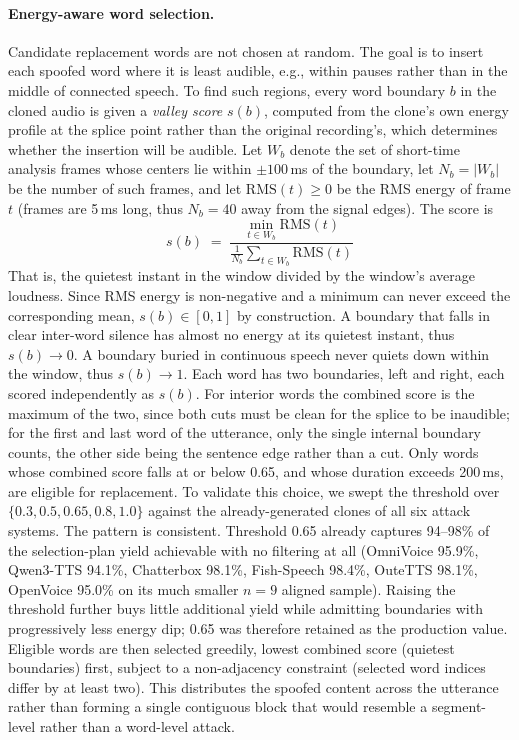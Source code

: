 \documentclass[11pt]{report}
\begin{document}
\paragraph{Energy-aware word selection.} Candidate replacement words are
not chosen at random. The goal is to insert each spoofed word where it is
least audible, e.g., within pauses rather than in the middle of connected
speech. To find such regions, every word boundary $b$ in the cloned audio is
given a \emph{valley score} $s(b)$, computed from the clone's own
energy profile at the splice point rather than the original
recording's, which determines whether the insertion will be
audible. Let $W_b$ denote the set of
short-time analysis frames whose centers lie within $\pm 100$\,ms of the
boundary, let $N_b = |W_b|$ be the number of such frames, and let
$\mathrm{RMS}(t) \ge 0$ be the RMS energy of frame $t$ (frames are
5\,ms long, thus $N_b = 40$ away from the signal edges). The score is
\begin{equation}
s(b) \;=\; \frac{\displaystyle\min_{t \in W_b} \mathrm{RMS}(t)}
                 {\displaystyle\frac{1}{N_b}\sum_{t \in W_b} \mathrm{RMS}(t)}
\label{eq:valleyscore}
\end{equation}
That is, the quietest instant in the window divided by the window's
average loudness. Since RMS energy is non-negative and a minimum can
never exceed the corresponding mean, $s(b) \in [0,1]$ by construction. A
boundary that falls in clear inter-word silence has almost no energy at
its quietest instant, thus $s(b) \to 0$. A boundary buried in continuous
speech never quiets down within the window, thus $s(b) \to 1$. Each word
has two boundaries, left and right, each scored independently as
$s(b)$. For interior words the combined score is the maximum of the
two, since both cuts must be clean for the splice to be inaudible; for
the first and last word of the utterance, only the single internal
boundary counts, the other side being the sentence edge rather than a
cut. Only words whose combined score falls at or below 0.65, and whose
duration exceeds 200\,ms, are eligible for replacement. To validate
this choice, we swept the threshold over $\{0.3, 0.5, 0.65, 0.8, 1.0\}$
against the already-generated clones of all six attack systems. The
pattern is consistent. Threshold 0.65 already captures 94--98\% of the
selection-plan yield achievable with no filtering at all (OmniVoice
95.9\%, Qwen3-TTS 94.1\%, Chatterbox 98.1\%, Fish-Speech 98.4\%,
OuteTTS 98.1\%, OpenVoice 95.0\% on its much smaller $n=9$ aligned
sample). Raising the threshold further buys little additional yield
while admitting boundaries with progressively less energy dip; 0.65
was therefore retained as the production value. Eligible words are then selected
greedily, lowest combined score (quietest boundaries) first, subject to
a non-adjacency constraint (selected word indices differ by at least
two). This distributes the spoofed content across the utterance rather
than forming a single contiguous block that would resemble a
segment-level rather than a word-level attack.
\end{document}
